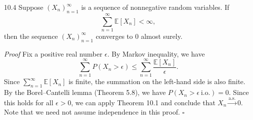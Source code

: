 \begin{thmbox}{10.4}
Suppose $(X_n)_{n=1}^{\infty}$ is a sequence of nonnegative random variables. If
\[
\sum_{n=1}^{\infty}\mathbb{E}[X_n]<\infty,
\]
then the sequence $(X_n)_{n=1}^{\infty}$ converges to $0$ almost surely.
\end{thmbox}

\textit{Proof}
Fix a positive real number $\epsilon$. By Markov inequality, we have
\[
\sum_{n=1}^{\infty}P(X_n>\epsilon)
\leq
\sum_{n=1}^{\infty}\frac{\mathbb{E}[X_n]}{\epsilon}.
\]
Since $\sum_{n=1}^{\infty}\mathbb{E}[X_n]$ is finite, the summation on the left-hand side is also finite. By the Borel--Cantelli lemma (Theorem 5.8), we have $P(X_n>\epsilon\ \mathrm{i.o.})=0$. Since this holds for all $\epsilon>0$, we can apply Theorem 10.1 and conclude that $X_n\xrightarrow{\mathrm{a.s.}}0$. Note that we need not assume independence in this proof.
\hfill $\square$
